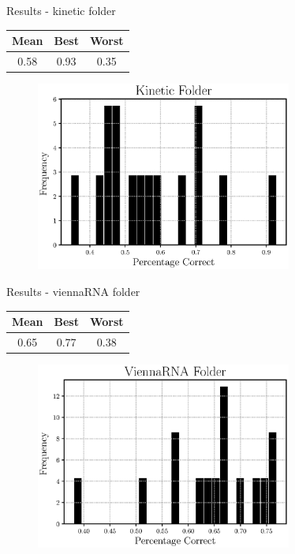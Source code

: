 \documentclass{beamer}
\begin{document}
\begin{frame}{Results - kinetic folder}
\begin{table}
\centering
\begin{tabular}{|ccc|}
\hline
{\bf Mean} & {\bf Best} & {\bf Worst}\\
\hline
\hline
0.58 & 0.93 & 0.35\\
\hline
\end{tabular}
\end{table}
\begin{figure}
\centering
\includegraphics[width =0.75\textwidth]{myfolder_pseudo.eps}
\end{figure}
\end{frame}
\begin{frame}{Results - viennaRNA folder}
\begin{table}
\centering
\begin{tabular}{|ccc|}
\hline
{\bf Mean} & {\bf Best} & {\bf Worst}\\
\hline
\hline
0.65 & 0.77 & 0.38\\
\hline
\end{tabular}
\end{table}
\begin{figure}
\centering
\includegraphics[width =0.75\textwidth]{viennarna_pseudo.eps}
\end{figure}
\end{frame}
\end{document}

